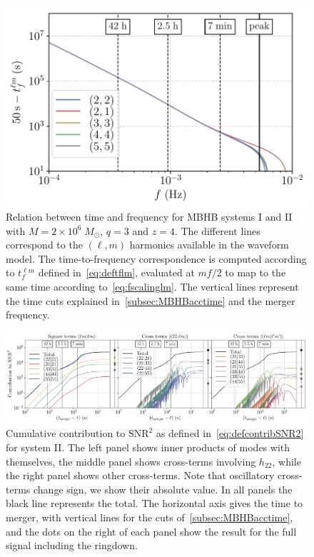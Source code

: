 \documentclass[aps,showpacs,twocolumn,prd,superscriptaddress,nofootinbib]{revtex4-1}
\begin{document}
\begin{figure}
   \includegraphics[width=.99\linewidth]{tflm_smbh.pdf}
  \caption{Relation between time and frequency for MBHB systems I and II with $M=2\times 10^6 \; M_{\odot}$, $q=3$ and $z=4$. The different lines correspond to the $(\ell, m)$ harmonics available in the waveform model. The time-to-frequency correspondence is computed according to $t_{f}^{\ell m}$ defined in~\eqref{eq:deftflm}, evaluated at $m f / 2$ to map to the same time according to~\eqref{eq:fscalinglm}. The vertical lines represent the time cuts explained in~\ref{subsec:MBHBacctime} and the merger frequency.}
  \label{fig:t-f-relation-lm}
\end{figure}

\begin{figure}
  \centering
  \includegraphics[width=.98\linewidth]{overlapmodebymode_maxfscaledlm_t.pdf}
  \caption{Cumulative contribution to $\mathrm{SNR}^{2}$ as defined in~\eqref{eq:defcontribSNR2} for system II. The left panel shows inner products of modes with themselves, the middle panel shows cross-terms involving $h_{22}$, while the right panel shows other cross-terms. Note that oscillatory cross-terms change sign, we show their absolute value. In all panels the black line represents the total. The horizontal axis gives the time to merger, with vertical lines for the cuts of~\ref{subsec:MBHBacctime}, and the dots on the right of each panel show the result for the full signal including the ringdown.}
  \label{fig:modeoverlapsoftime}
\end{figure}
\end{document}
